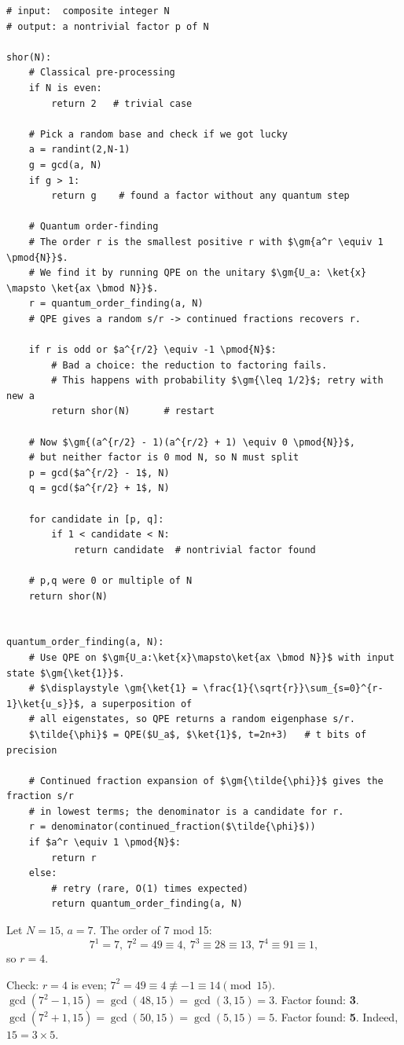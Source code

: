 \documentclass[oneside]{academica}
\begin{document}
\begin{lstlisting}
# input:  composite integer N
# output: a nontrivial factor p of N

shor(N):
    # Classical pre-processing
    if N is even:
        return 2   # trivial case

    # Pick a random base and check if we got lucky
    a = randint(2,N-1)
    g = gcd(a, N)
    if g > 1:
        return g    # found a factor without any quantum step

    # Quantum order-finding
    # The order r is the smallest positive r with $\gm{a^r \equiv 1 \pmod{N}}$.
    # We find it by running QPE on the unitary $\gm{U_a: \ket{x} \mapsto \ket{ax \bmod N}}$.
    r = quantum_order_finding(a, N)
    # QPE gives a random s/r -> continued fractions recovers r.

    if r is odd or $a^{r/2} \equiv -1 \pmod{N}$:
        # Bad a choice: the reduction to factoring fails.
        # This happens with probability $\gm{\leq 1/2}$; retry with new a
        return shor(N)      # restart

    # Now $\gm{(a^{r/2} - 1)(a^{r/2} + 1) \equiv 0 \pmod{N}}$,
    # but neither factor is 0 mod N, so N must split
    p = gcd($a^{r/2} - 1$, N)
    q = gcd($a^{r/2} + 1$, N)

    for candidate in [p, q]:
        if 1 < candidate < N:
            return candidate  # nontrivial factor found

    # p,q were 0 or multiple of N
    return shor(N)


quantum_order_finding(a, N):
    # Use QPE on $\gm{U_a:\ket{x}\mapsto\ket{ax \bmod N}}$ with input state $\gm{\ket{1}}$.
    # $\displaystyle \gm{\ket{1} = \frac{1}{\sqrt{r}}\sum_{s=0}^{r-1}\ket{u_s}}$, a superposition of
    # all eigenstates, so QPE returns a random eigenphase s/r.
    $\tilde{\phi}$ = QPE($U_a$, $\ket{1}$, t=2n+3)   # t bits of precision

    # Continued fraction expansion of $\gm{\tilde{\phi}}$ gives the fraction s/r
    # in lowest terms; the denominator is a candidate for r.
    r = denominator(continued_fraction($\tilde{\phi}$))
    if $a^r \equiv 1 \pmod{N}$:
        return r
    else:
        # retry (rare, O(1) times expected)
        return quantum_order_finding(a, N)
\end{lstlisting}

\begin{example*}[Factoring 15]
  Let $N=15$, $a=7$.
  The order of 7 mod 15:
  \begin{equation*}
    7^1=7,\ 7^2=49 \equiv 4,\ 7^3 \equiv 28 \equiv 13,\ 7^4 \equiv 91 \equiv 1,
  \end{equation*}
  so $r=4$.
  
  Check: $r=4$ is even; $7^2=49\equiv4\not\equiv-1\equiv14\pmod{15}$.
  $\gcd(7^2-1,15)=\gcd(48,15)=\gcd(3,15)=3$. \quad Factor found: \textbf{3}.
  $\gcd(7^2+1,15)=\gcd(50,15)=\gcd(5,15)=5$. \quad Factor found: \textbf{5}.
  Indeed, $15=3\times5$.
\end{example*}
\end{document}
